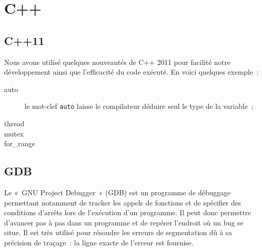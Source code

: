 \section{C++}

\subsection{C++11}
Nous avons utilisé quelques nouveautés de C++ 2011 pour facilité notre développement ainsi que l'efficacité du code exécuté. En voici quelques exemple~:
\begin{description}
\item[auto] le mot-clef \verb|auto| laisse le compilateur déduire seul le type de la variable~;
\item[thread]
\item[mutex]
\item[for_range]
\end{description}

\subsection{GDB}
Le «~GNU Project Debugger~» (GDB) est un programme de débuggage permettant notamment de tracker les appels de fonctions et de spécifier des conditions d'arrêts lors de l'exécution d'un programme. Il peut donc permettre d'avancer pas à pas dans un programme et de repérer l'endroit où un bug se situe. Il est très utilisé pour résoudre les erreurs de segmentation dû à sa précision de traçage~: la ligne exacte de l'erreur est fournise.
